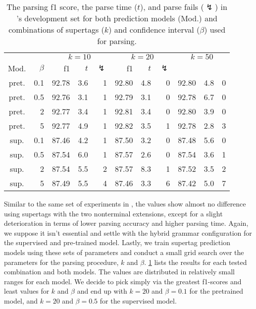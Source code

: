 \documentclass[../../document.tex]{subfiles}
\begin{document}
    \begin{table}
        \caption{\label{tbl:experiments:tiger:k}
        The parsing f1 score, the parse time ($t$), and parse fails ($\lightning$) in \tiger{}'s development set for both prediction models (Mod.) and combinations of supertags ($k$) and confidence interval ($\beta$) used for parsing.
        }
        \centering
        \setlength{\tabcolsep}{4pt}
        \vspace{.2cm}
        \begin{tabular}{cr|rrr|rrr|rrr}
            \toprule
&      &      \multicolumn{3}{c|}{$k = 10$} & \multicolumn{3}{c|}{$k = 20$} & \multicolumn{3}{c}{$k = 50$} \\
Mod. &  $\beta$  & f1 & $t$ & $\lightning$ & f1 & $t$ & $\lightning$ \\ \hline
pret. & 0.1  & 92.78 & 3.6 & 1 & 92.80 & 4.8 & 0 & 92.80 & 4.8 & 0 \\
pret. & 0.5  & 92.76 & 3.1 & 1 & 92.79 & 3.1 & 0 & 92.78 & 6.7 & 0 \\
pret. &   2  & 92.77 & 3.4 & 1 & 92.81 & 3.4 & 0 & 92.80 & 3.9 & 0 \\
pret. &   5  & 92.77 & 4.9 & 1 & 92.82 & 3.5 & 1 & 92.78 & 2.8 & 3 \\
\midrule 
sup. & 0.1  & 87.46 & 4.2 & 1 & 87.50 & 3.2 & 0 & 87.48 & 5.6 & 0 \\
sup. & 0.5  & 87.54 & 6.0 & 1 & 87.57 & 2.6 & 0 & 87.54 & 3.6 & 1 \\
sup. &   2  & 87.54 & 5.5 & 2 & 87.57 & 8.3 & 1 & 87.52 & 3.5 & 2 \\
sup. &   5  & 87.49 & 5.5 & 4 & 87.46 & 3.3 & 6 & 87.42 & 5.0 & 7 \\
    \bottomrule
        \end{tabular}
    \end{table}

    Similar to the same set of experiments in , the values show almost no difference using  supertags with the two nonterminal extensions, except for a slight deterioration in terms of lower parsing accuracy and higher parsing time.
    Again, we suppose it isn't essential and settle with the hybrid grammar configuration for the supervised and pre-trained model.
    Lastly, we train supertag prediction models using these sets of parameters and conduct a small grid search over the parameters for the parsing procedure, $k$ and $\beta$.
    \cref{tbl:experiments:tiger:k} lists the results for each tested combination and both models.
    The values are distributed in relatively small ranges for each model.
    We decide to pick simply via the greatest f1-scores and least values for \(k\) and \(\beta\) and end up with \(k=20\) and \(\beta=0.1\) for the pretrained model, and \(k=20\) and \(\beta=0.5\) for the supervised model.
\end{document}
